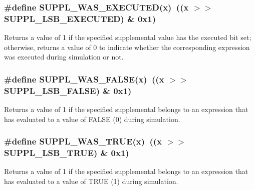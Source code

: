 \subsubsection{\setlength{\rightskip}{0pt plus 5cm}\#define SUPPL\_\-WAS\_\-EXECUTED(x)\ ((x $>$$>$ SUPPL\_\-LSB\_\-EXECUTED) \& 0x1)}\label{group__expr__suppl_a13}


Returns a value of 1 if the specified supplemental value has the executed bit set; otherwise, returns a value of 0 to indicate whether the corresponding expression was executed during simulation or not. 
\subsubsection{\setlength{\rightskip}{0pt plus 5cm}\#define SUPPL\_\-WAS\_\-FALSE(x)\ ((x $>$$>$ SUPPL\_\-LSB\_\-FALSE) \& 0x1)}\label{group__expr__suppl_a18}


Returns a value of 1 if the specified supplemental belongs to an expression that has evaluated to a value of FALSE (0) during simulation. 
\subsubsection{\setlength{\rightskip}{0pt plus 5cm}\#define SUPPL\_\-WAS\_\-TRUE(x)\ ((x $>$$>$ SUPPL\_\-LSB\_\-TRUE) \& 0x1)}\label{group__expr__suppl_a17}


Returns a value of 1 if the specified supplemental belongs to an expression that has evaluated to a value of TRUE (1) during simulation. 